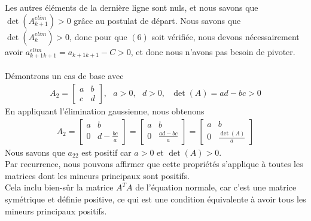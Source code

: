 \documentclass[11pt]{article}
\begin{document}
Les autres éléments de la dernière ligne sont nuls, et nous savons que $\det(A_{k+1}^{elim}) > 0$ grâce au postulat de départ. Nous savons que $\det(A_k^{elim}) > 0$, donc pour que $(6)$ soit vérifiée, nous devons nécessairement avoir $a^{elim}_{k+1k+1} = a_{k+1k+1} - C > 0$, et donc nous n'avons pas besoin de pivoter.\\\\
Démontrons un cas de base avec
\begin{align}
    A_2 = \left[\begin{array}{cc}
        a & b\\
        c & d
    \end{array}\right], ~~~ a > 0, ~~~ d > 0, ~~~ \det(A) = ad - bc > 0
\end{align}
En appliquant l'élimination gaussienne, nous obtenons
\begin{align}
    A_2 = \left[\begin{array}{cc}
        a & b\\
        0 & d - \frac{bc}{a}
    \end{array}\right] =
    \left[\begin{array}{cc}
        a & b\\
        0 & \frac{ad - bc}{a}
    \end{array}\right] = 
    \left[\begin{array}{cc}
        a & b\\
        0 & \frac{\det(A)}{a}
    \end{array}\right]
\end{align}
Nous savons que $a_{22}$ est positif car $a > 0$ et $\det(A) > 0$.\\
Par recurrence, nous pouvons affirmer que cette propriétés s'applique à toutes les matrices dont les mineurs principaux sont positifs.\\
Cela inclu bien-sûr la matrice $A^TA$ de l'équation normale, car c'est une matrice symétrique et définie positive, ce qui est une condition équivalente à avoir tous les mineurs principaux positifs.
\end{document}
